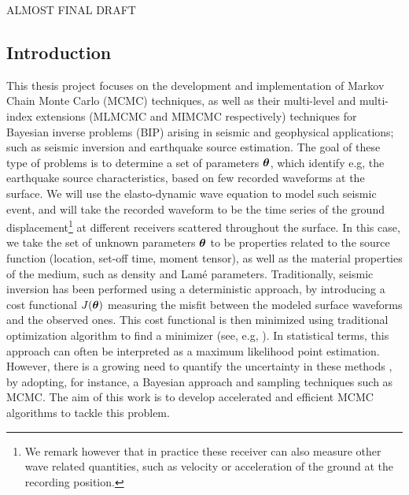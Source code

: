 
\hspace*{0.3cm}


\hspace*{0.3cm}
\color{red}  ALMOST FINAL DRAFT  \color{black}
\subsection{Introduction}
This thesis project focuses on the development and implementation of Markov Chain Monte Carlo (MCMC) techniques, as well as their multi-level and multi-index extensions (MLMCMC and MIMCMC respectively) techniques for Bayesian inverse problems (BIP) arising in seismic
and geophysical applications; such as seismic inversion and earthquake
source estimation. The goal of these type of problems is to determine a set of parameters $\bm{\theta}$, which identify e.g, the earthquake source characteristics, based on few recorded waveforms at the surface. We will use the elasto-dynamic wave  equation to model such seismic event, and will take the recorded waveform to be the time series of the ground displacement\footnote{We remark however that in practice these receiver can also measure  other wave related quantities, such as velocity or acceleration of the ground at the recording position. } at different receivers scattered throughout the surface. In this case, we take the set of unknown parameters $\bm{\theta}$ to be properties related to the source function (location, set-off time, moment tensor), as well as the material properties of the medium, such as density and Lam\'e parameters.  Traditionally, seismic inversion has been performed using a deterministic approach, by introducing a cost functional $J(\bm{\theta})$ measuring the misfit between the modeled surface waveforms and the observed ones. This cost functional is then minimized using traditional optimization algorithm to find a minimizer (see, e.g, \cite{tromp2005seismic,burstedde2009algorithmic}). In statistical terms, this approach can often be interpreted as a maximum likelihood point estimation. However, there is a growing need to quantify the uncertainty in these methods \cite{SRCMOD}, by adopting, for instance, a Bayesian approach and sampling techniques such as MCMC. The aim of this work is to develop accelerated and efficient MCMC algorithms to tackle this problem.
